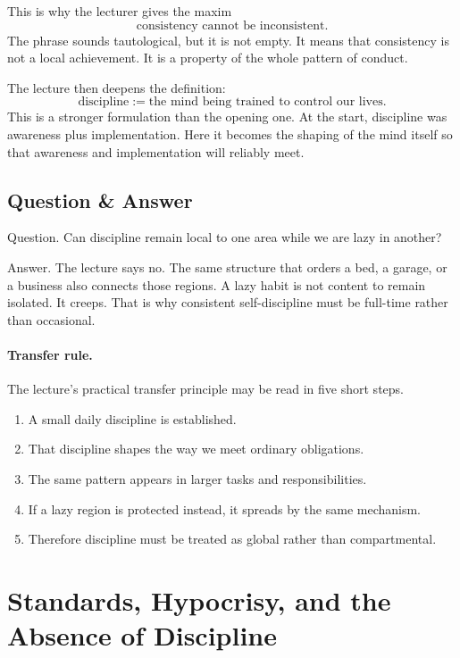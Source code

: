 This is why the lecturer gives the maxim
\begin{equation}
\text{consistency cannot be inconsistent}.
\end{equation}
The phrase sounds tautological, but it is not empty. It means that consistency is not a local achievement. It is a property of the whole pattern of conduct.

The lecture then deepens the definition:
\begin{equation}
\text{discipline} := \text{the mind being trained to control our lives}.
\end{equation}
This is a stronger formulation than the opening one. At the start, discipline was awareness plus implementation. Here it becomes the shaping of the mind itself so that awareness and implementation will reliably meet.

\subsection{Question \& Answer}

Question. Can discipline remain local to one area while we are lazy in another?

Answer. The lecture says no. The same structure that orders a bed, a garage, or a business also connects those regions. A lazy habit is not content to remain isolated. It creeps. That is why consistent self-discipline must be full-time rather than occasional.

\paragraph{Transfer rule.}
The lecture's practical transfer principle may be read in five short steps.
\begin{enumerate}
\item A small daily discipline is established.
\item That discipline shapes the way we meet ordinary obligations.
\item The same pattern appears in larger tasks and responsibilities.
\item If a lazy region is protected instead, it spreads by the same mechanism.
\item Therefore discipline must be treated as global rather than compartmental.
\end{enumerate}

\section{Standards, Hypocrisy, and the Absence of Discipline}

